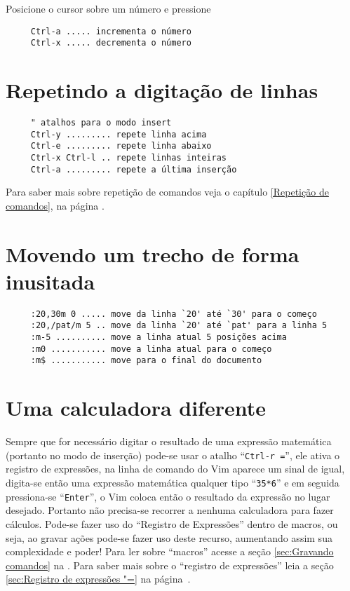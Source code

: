 Posicione o cursor sobre um número e pressione

\begin{verbatim}
     Ctrl-a ..... incrementa o número
     Ctrl-x ..... decrementa o número
\end{verbatim}

\section{Repetindo a digitação de linhas}
\label{Repetindo a digitação de linhas}

\begin{verbatim}
     " atalhos para o modo insert
     Ctrl-y ......... repete linha acima
     Ctrl-e ......... repete linha abaixo
     Ctrl-x Ctrl-l .. repete linhas inteiras
     Ctrl-a ......... repete a última inserção
\end{verbatim}

{\Large {}} Para saber mais sobre repetição de comandos veja o capítulo
\ref{Repetição de comandos}, na página \pageref{Repetição de comandos}.

\section{Movendo um trecho de forma inusitada}
\label{Movendo um trecho de forma inusitada}

\begin{verbatim}
     :20,30m 0 ..... move da linha `20' até `30' para o começo
     :20,/pat/m 5 .. move da linha `20' até `pat' para a linha 5
     :m-5 .......... move a linha atual 5 posições acima
     :m0 ........... move a linha atual para o começo
     :m$ ........... move para o final do documento
\end{verbatim}

\section{Uma calculadora diferente}
\label{Uma calculadora diferente}

Sempre que for necessário digitar  o resultado de uma expressão matemática
(portanto no modo de inserção) pode-se usar o atalho ``{\tt Ctrl-r =}'', ele
ativa o registro de expressões, na linha de comando do Vim aparece um sinal de
igual, digita-se então uma expressão matemática qualquer tipo ``{\tt 35*6}'' e
em seguida pressiona-se ``{\tt Enter}'', o Vim coloca então o resultado da
expressão no lugar desejado.  Portanto não precisa-se recorrer a nenhuma
calculadora para fazer cálculos.  Pode-se fazer uso do ``Registro de
Expressões'' dentro de macros, ou seja, ao gravar ações pode-se fazer uso deste
recurso, aumentando assim sua complexidade e poder! Para ler sobre ``macros''
acesse a seção \ref{sec:Gravando comandos} na \pageref{sec:Gravando comandos}.
Para saber mais sobre o ``registro de expressões'' leia a seção
\ref{sec:Registro de expressões "=} na página~\pageref{sec:Registro de expressões "=}.

